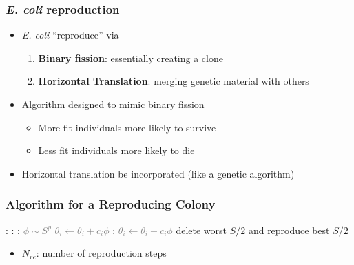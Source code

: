 \documentclass{beamer}
\begin{document}
\begin{frame}
\frametitle{\textit{E. coli} reproduction}
\begin{itemize}
  \item<1-> \textit{E. coli} ``reproduce'' via
  \begin{enumerate}
    \item<1-> \textbf{Binary fission}: essentially creating a clone
    \item<1-> \textbf{Horizontal Translation}: merging genetic material with others
  \end{enumerate}
  \item<2-> Algorithm designed to mimic binary fission
  \begin{itemize}
    \item<2-> More fit individuals more likely to survive
    \item<2-> Less fit individuals more likely to die
  \end{itemize}
  \item<3-> Horizontal translation  be incorporated (like a genetic algorithm)
\end{itemize}
\end{frame}

\begin{frame}
\frametitle{Algorithm for a Reproducing Colony}
\begin{algorithmic}[1]
:
  \For {\textcolor{gray}{$j \gets 1 \dots N_c $}}:
    \For {\textcolor{gray}{$i \gets 1 \dots S$}}:
      \State \textcolor{gray}{$\phi \sim S^p$}
      \State \textcolor{gray}{$\theta_i \gets \theta_i + c_i \phi$}
      :
        \State \textcolor{gray}{$\theta_i \gets \theta_i + c_i \phi$}
      \EndWhile
    \EndFor
  \EndFor
  \State delete worst $S/2$ and reproduce best $S/2$
\EndFor
\end{algorithmic}
\begin{itemize}
  \item $N_{re}$: number of reproduction steps
\end{itemize}
\end{frame}
\end{document}
